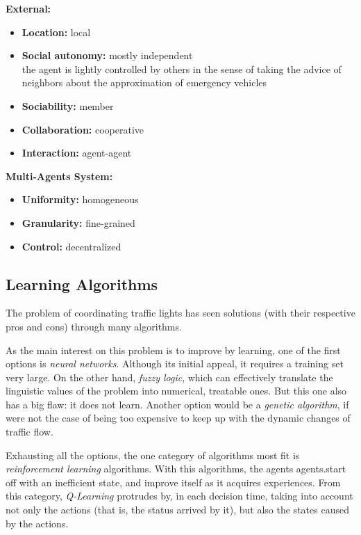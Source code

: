 \documentclass[10pt,a4paper]{article}
\begin{document}
	\textbf{External:}
    \begin{itemize}
    \item \textbf{Location:} local
    \item \textbf{Social autonomy:} mostly independent \\
    	the agent is lightly controlled by others in the sense of taking the advice of neighbors about the approximation of emergency vehicles
    \item \textbf{Sociability:} member
    \item \textbf{Collaboration:} cooperative
    \item \textbf{Interaction:} agent-agent
    \end{itemize}
    
    \textbf{Multi-Agents System:}
    \begin{itemize}
    \item \textbf{Uniformity:} homogeneous
    \item \textbf{Granularity:} fine-grained
    \item \textbf{Control:} decentralized
    \end{itemize}

\subsection{Learning Algorithms}
	The problem of coordinating traffic lights has seen solutions (with their respective pros and cons) through many algorithms. 
    
    As the main interest on this problem is to improve by learning, one of the first options is \textit{neural networks}. Although its initial appeal, it requires a training set very large. On the other hand, \textit{fuzzy logic}, which can effectively translate the linguistic values of the problem into numerical, treatable ones. But this one also has a big flaw: it does not learn. Another option would be a \textit{genetic algorithm}, if were not the case of being too expensive to keep up with the dynamic changes of traffic flow. \cite{Oliveira2006} 
    
    Exhausting all the options, the one category of algorithms most fit is \textit{reinforcement learning} algorithms. With this algorithms, the agents agents.start off with an inefficient state, and improve itself as it acquires experiences. From this category, \textit{Q-Learning} protrudes by, in each decision time, taking into account not only the actions (that is, the status arrived by it), but also the states caused by the actions.
\end{document}
